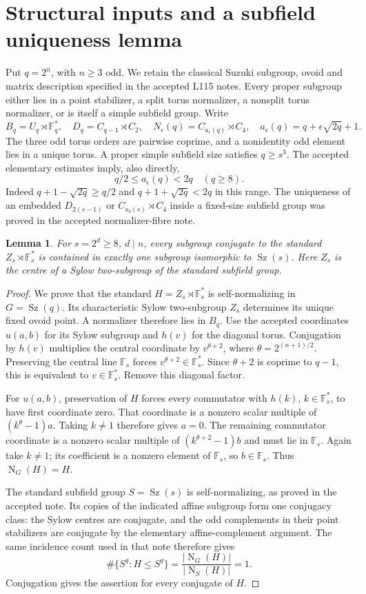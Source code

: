 \documentclass[11pt,a4paper]{article}
\newtheorem{lemma}{Lemma}
\newcommand{\F}{\mathbb F}
\newcommand{\Sz}{\operatorname{Sz}}
\newcommand{\N}{\operatorname{N}}
\begin{document}
\section{Structural inputs and a subfield uniqueness lemma}
Put $q=2^n$, with $n\ge3$ odd. We retain the classical Suzuki subgroup,
ovoid and matrix description specified in the accepted L115 notes.
Every proper subgroup either lies in a point stabilizer, a split torus
normalizer, a nonsplit torus normalizer, or is itself a simple subfield
group. Write
\[
 B_q=U_q\rtimes\F_q^*,\quad D_q=C_{q-1}\rtimes C_2,
 \quad N_\epsilon(q)=C_{a_\epsilon(q)}\rtimes C_4,
 \quad a_\epsilon(q)=q+\epsilon\sqrt{2q}+1.
\]
The three odd torus orders are pairwise coprime, and a nonidentity odd
element lies in a unique torus. A proper simple subfield size satisfies
$q\ge s^3$. The accepted elementary estimates imply, also directly,
\begin{equation}\label{bounds}
 q/2\le a_\epsilon(q)<2q \quad(q\ge8).
\end{equation}
Indeed $q+1-\sqrt{2q}\ge q/2$ and
$q+1+\sqrt{2q}<2q$ in this range.
The uniqueness of an embedded $D_{2(s-1)}$ or
$C_{a_\delta(s)}\rtimes C_4$ inside a fixed-size subfield group
was proved in the accepted normalizer-fibre note.

\begin{lemma}\label{affine}
For $s=2^d\ge8$, $d\mid n$, every subgroup conjugate to the standard
$Z_s\rtimes\F_s^*$ is contained in exactly one subgroup isomorphic
to $\Sz(s)$. Here $Z_s$ is the centre of a Sylow two-subgroup of
the standard subfield group.
\end{lemma}
\begin{proof}
We prove that the standard $H=Z_s\rtimes\F_s^*$ is self-normalizing
in $G=\Sz(q)$. Its characteristic Sylow two-subgroup $Z_s$ determines
its unique fixed ovoid point. A normalizer therefore lies in $B_q$.
Use the accepted coordinates $u(a,b)$ for its Sylow subgroup and $h(v)$
for the diagonal torus. Conjugation by $h(v)$ multiplies the central
coordinate by $v^{\theta+2}$, where $\theta=2^{(n+1)/2}$.
Preserving the central line $\F_s$ forces
$v^{\theta+2}\in\F_s^*$. Since $\theta+2$ is coprime to $q-1$,
this is equivalent to $v\in\F_s^*$. Remove this diagonal factor.

For $u(a,b)$, preservation of $H$ forces every commutator with
$h(k)$, $k\in\F_s^*$, to have first coordinate zero. That coordinate
is a nonzero scalar multiple of $(k^\theta-1)a$. Taking $k\ne1$
therefore gives $a=0$. The remaining commutator coordinate is a
nonzero scalar multiple of $(k^{\theta+2}-1)b$ and must lie in
$\F_s$. Again take $k\ne1$; its coefficient is a nonzero element
of $\F_s$, so $b\in\F_s$. Thus $\N_G(H)=H$.

The standard subfield group $S=\Sz(s)$ is self-normalizing, as proved
in the accepted note. Its copies of the indicated affine subgroup form
one conjugacy class: the Sylow centres are conjugate, and the odd
complements in their point stabilizers are conjugate by the elementary
affine-complement argument. The same incidence count used in that note
therefore gives
\[
 \#\{S^g:H\le S^g\}=\frac{|\N_G(H)|}{|\N_S(H)|}=1.
\]
Conjugation gives the assertion for every conjugate of $H$.
\end{proof}
\end{document}
